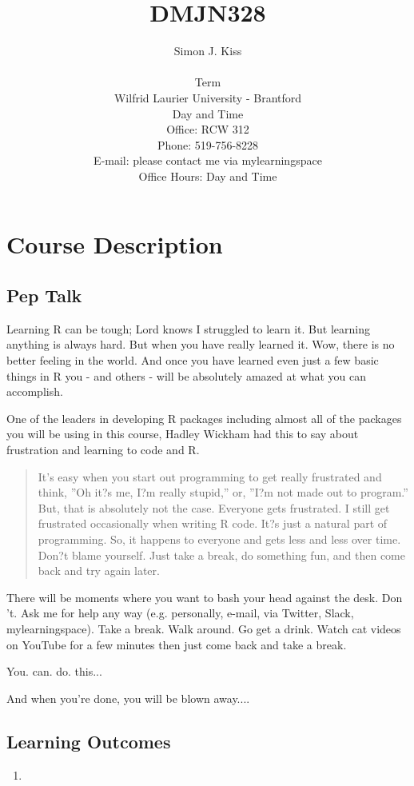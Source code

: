 \documentclass{article}
\title{DMJN328}
\author{Simon J. Kiss\\\\Term\\
Wilfrid Laurier University - Brantford\\
Day and Time\\Office: RCW 312 \\
Phone: 519-756-8228\\
E-mail: please contact me via mylearningspace\\
Office Hours: Day and Time}
\date{}
\begin{document}
\maketitle
\begin{center}

\end{center}
\section*{Course Description}

\subsection*{Pep Talk}
Learning R can be tough; Lord knows I struggled to learn it. But learning anything is always hard. But when you have really learned it. Wow, there is no better feeling in the world.  And once you have learned even just a few basic things in R you - and others - will be absolutely amazed at what you can accomplish.

One of the leaders in developing R packages including almost all of the packages you will be using in this course, Hadley Wickham had this to say about frustration and learning to code and R. 
\begin{quote}
 
It's easy when you start out programming to get really frustrated and think, ''Oh it?s me, I?m really stupid,'' or, ''I?m not made out to program.'' But, that is absolutely not the case. Everyone gets frustrated. I still get frustrated occasionally when writing R code. It?s just a natural part of programming. So, it happens to everyone and gets less and less over time. Don?t blame yourself. Just take a break, do something fun, and then come back and try again later.
\end{quote}

There will be moments where you want to bash your head against the desk.  Don\\'t. Ask me for help any way (e.g. personally, e-mail, via Twitter, Slack, mylearningspace). Take a break. Walk around. Go get a drink. Watch cat videos on YouTube for a few minutes then just come back and take a break.

You. can. do. this...

And when you're done, you will be blown away....

\subsection*{Learning Outcomes}
\begin{enumerate}
\item \end{enumerate}
 
\end{document}
